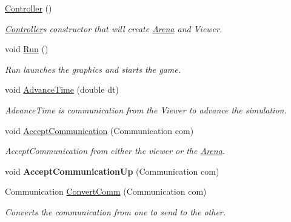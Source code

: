 \begin{DoxyCompactItemize}
\item 
\mbox{\label{class_controller_a95c56822d667e94b031451729ce069a9}} 
\mbox{\hyperlink{class_controller_a95c56822d667e94b031451729ce069a9}{Controller}} ()
\begin{DoxyCompactList}\small\item\em \mbox{\hyperlink{class_controller}{Controller}}\textquotesingle{}s constructor that will create \mbox{\hyperlink{class_arena}{Arena}} and Viewer. \end{DoxyCompactList}\item 
\mbox{\label{class_controller_a17abb2cec6c0109e9b2df3cdc082eaad}} 
void \mbox{\hyperlink{class_controller_a17abb2cec6c0109e9b2df3cdc082eaad}{Run}} ()
\begin{DoxyCompactList}\small\item\em Run launches the graphics and starts the game. \end{DoxyCompactList}\item 
\mbox{\label{class_controller_a6a4a3eaee03f6c4718da3f8293d7e053}} 
void \mbox{\hyperlink{class_controller_a6a4a3eaee03f6c4718da3f8293d7e053}{Advance\+Time}} (double dt)
\begin{DoxyCompactList}\small\item\em Advance\+Time is communication from the Viewer to advance the simulation. \end{DoxyCompactList}\item 
\mbox{\label{class_controller_a55b8d46984535adb91f40309914e8852}} 
void \mbox{\hyperlink{class_controller_a55b8d46984535adb91f40309914e8852}{Accept\+Communication}} (Communication com)
\begin{DoxyCompactList}\small\item\em Accept\+Communication from either the viewer or the \mbox{\hyperlink{class_arena}{Arena}}. \end{DoxyCompactList}\item 
\mbox{\label{class_controller_a9cd0e53064f5cae41d8cf2aaeee81055}} 
void {\bfseries Accept\+Communication\+Up} (Communication com)
\item 
Communication \mbox{\hyperlink{class_controller_ae9b0504ab74cdacc654528b609074adc}{Convert\+Comm}} (Communication com)
\begin{DoxyCompactList}\small\item\em Converts the communication from one to send to the other. \end{DoxyCompactList}\end{DoxyCompactItemize}


